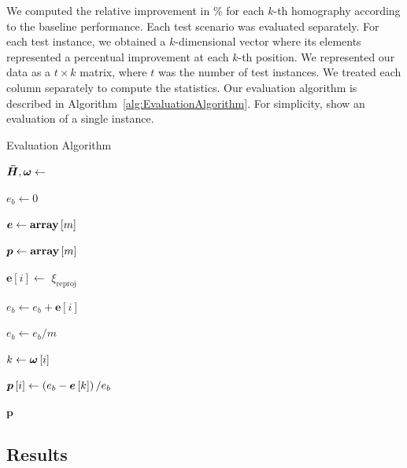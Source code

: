 We computed the relative improvement in \% for each $k$-th homography according to the baseline performance. Each test scenario was evaluated separately. For each test instance, we obtained a $k$-dimensional vector where its elements represented a percentual improvement at each $k$-th position. We represented our data as a $t \times k$ matrix, where $t$ was the number of test instances. We treated each column separately to compute the statistics. Our evaluation algorithm is described in Algorithm~\ref{alg:EvaluationAlgorithm}. For simplicity, show an evaluation of a single instance.

\def\meanerrs{\boldsymbol{e}}
\def\errdiffs{\boldsymbol{p}}
\def\arracc{\left[ \right]}

\begin{algorithm}[t]
    \caption{Evaluation Algorithm}
    \label{alg:EvaluationAlgorithm}
    \begin{algorithmic}[1]
        \State $\boldsymbol{\bar{H}}, \boldsymbol{\omega} \gets $ 

        \State $e_b \gets 0$

        \State $\meanerrs \gets \arraydef \left[ m \right]$

        \State $\errdiffs \gets \arraydef \left[ m \right]$

        \State $\meanerrs \left[ i \right] \gets $ $\xi_{\text{reproj}}$

        \State $e_b \gets e_b + \meanerrs \left[ i \right]$
        \EndFor

        \State $e_b \gets e_b / m$

        \State $k \gets \boldsymbol{\omega} \left[ i \right]$

        \State $\errdiffs \left[ i \right] \gets \rbrackets{e_b - \meanerrs \left[ k \right]} / e_b$
        \EndFor

        \State \Return $\errdiffs$
    \end{algorithmic}
\end{algorithm}

\subsection{Results}
\label{ssec:EvaluationResults}

